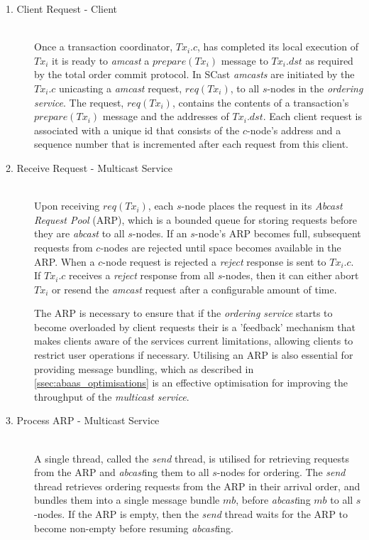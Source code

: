 	\begin{description}
		\item[1. Client Request - Client] \hfill \\
		Once a transaction coordinator, $Tx_i.c$, has completed its local execution of $Tx_i$ it is ready to \emph{amcast} a $prepare(Tx_i)$ message to $Tx_i.dst$ as required by the total order commit protocol.  In \textsf{SCast} \emph{amcasts} are initiated by the $Tx_i.c$ unicasting a \emph{amcast} request, $req(Tx_i)$, to all  $s$-nodes in the \emph{ordering service}.  The request, $req(Tx_i)$, contains the contents of a transaction's $prepare(Tx_i)$ message and the addresses of $Tx_i.dst$.  Each client request is associated with a unique id that consists of the $c$-node's address and a sequence number that is incremented after each request from this client.    
		
		\item[2. Receive Request - Multicast Service] \hfill \\
		Upon receiving $req(Tx_i)$, each $s$-node places the request in its \emph{Abcast Request Pool} (ARP), which is a bounded queue for storing requests before they are \emph{abcast} to all $s$-nodes.  If an $s$-node's ARP becomes full, subsequent requests from $c$-nodes are rejected until space becomes available in the ARP.  When a $c$-node request is rejected a \emph{reject} response is sent to $Tx_i.c$.  If $Tx_i.c$ receives a \emph{reject} response from all $s$-nodes, then it can either abort $Tx_i$ or resend the \emph{amcast} request after a configurable amount of time.    
		
		The ARP is necessary to ensure that if the \emph{ordering service} starts to become overloaded by client requests their is a 'feedback' mechanism that makes clients aware of the services current limitations, allowing clients to restrict user operations if necessary.  Utilising an ARP is also essential for providing message bundling, which as described in \ref{ssec:abaas_optimisations} is an effective optimisation for improving the throughput of the \emph{multicast service}.  
		
		\item[3. Process ARP - Multicast Service] \hfill \\
		A single thread, called the \emph{send} thread, is utilised for retrieving requests from the ARP and \emph{abcast}ing them to all $s$-nodes for ordering.  The \emph{send} thread retrieves ordering requests from the ARP in their arrival order, and bundles them into a single message bundle $mb$, before \emph{abcast}ing $mb$ to all $s$-nodes.  If the ARP is empty, then the \emph{send} thread waits for the ARP to become non-empty before resuming \emph{abcast}ing.  
		

\end{description}
